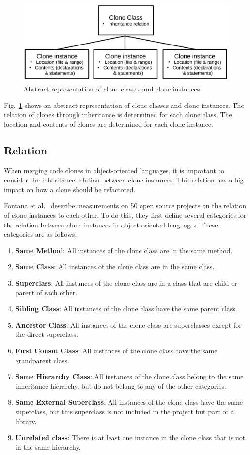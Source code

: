 \documentclass[runningheads]{llncs}
\begin{document}
\begin{figure}[H]
  \centering
    \includegraphics[width=0.8\columnwidth]{img/context}
    \caption{Abstract representation of clone classes and clone instances.}
  \label{fig:clonecontext}
\end{figure}

Fig.~\ref{fig:clonecontext} shows an abstract representation of clone classes and clone instances. The relation of clones through inheritance is determined for each clone class. The location and contents of clones are determined for each clone instance.

\subsection{Relation}\label{sec:setuprelation}
When merging code clones in object-oriented languages, it is important to consider the inheritance relation between clone instances. This relation has a big impact on how a clone should be refactored.

Fontana et al.~\cite{fontana2015duplicated} describe measurements on 50 open source projects on the relation of clone instances to each other. To do this, they first define several categories for the relation between clone instances in object-oriented languages. These categories are as follows:
\begin{enumerate}
  \item \textbf{Same Method}: All instances of the clone class are in the same method.
  \item \textbf{Same Class}: All instances of the clone class are in the same class.
  \item \textbf{Superclass}: All instances of the clone class are in a class that are child or parent of each other.
  \item \textbf{Sibling Class}: All instances of the clone class have the same parent class.
    \item \textbf{Ancestor Class}: All instances of the clone class are superclasses except for the direct superclass.
  \item \textbf{First Cousin Class}: All instances of the clone class have the same grandparent class.
\item \textbf{Same Hierarchy Class}: All instances of the clone class belong to the same inheritance hierarchy, but do not belong to any of the other categories.
\item \textbf{Same External Superclass}: All instances of the clone class have the same superclass, but this superclass is not included in the project but part of a library.
\item \textbf{Unrelated class}: There is at least one instance in the clone class that is not in the same hierarchy.
\end{enumerate}
\end{document}

